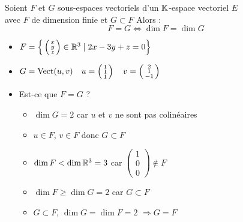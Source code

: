 \begin{frame}
\begin{corollaire}
Soient $F$ et $G$ sous-espaces vectoriels d'un $\mathbb{K}$-espace vectoriel $E$ \\
avec $F$ de dimension finie et $G \subset F$
Alors :
$$F=G \iff \dim F = \dim G$$
\end{corollaire}

\pause
\begin{exemple}
\begin{itemize}
\item
$F=\Big\{\left(\begin{smallmatrix}x\\y\\z\end{smallmatrix}\right) \in \mathbb{R}^{3}\mid 2x-3y+z=0\Big\}$
\pause
\item
$
G = \mathop{\text{Vect}}\nolimits (u,v)\quad
u=\left(\begin{smallmatrix}1\\1\\1\end{smallmatrix}\right) \quad
v=\left(\begin{smallmatrix}2\\1\\-1\end{smallmatrix}\right)$ 

\pause

\item 
Est-ce que $F=G$ ?

\pause
\begin{itemize}
\item $\dim G = 2$ car $u$ et $v$ ne sont pas colin\'eaires

\pause
\item
$u\in F$, $v\in F$ donc $G\subset F$
  
  \pause
  \item $\dim F < \dim \mathbb{R}^3 = 3$ car  $\left(\begin{smallmatrix}1\\0\\0\end{smallmatrix}\right)\notin F$
  
  \pause
  \item
 $\dim F \ge \dim G = 2$ car $G\subset F$
 

 
 \pause
 \item  
  $G \subset F$, $\dim G = \dim F = 2$ $\Rightarrow G=F$
  \end{itemize}
\end{itemize}
\end{exemple}

\end{frame}




